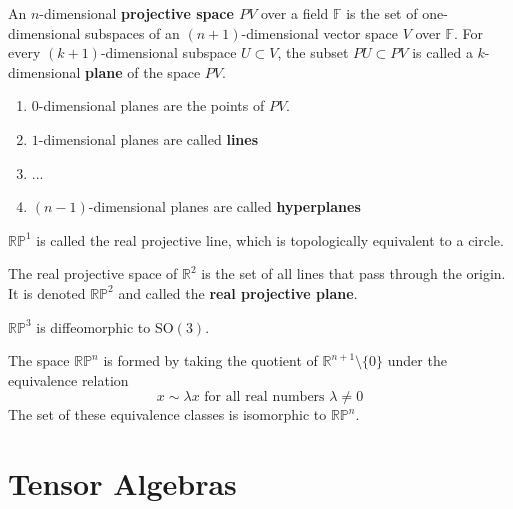 \documentclass{article}
\begin{document}
    \begin{definition}
      An $n$-dimensional \textbf{projective space $PV$} over a field $\mathbb{F}$ is the set of one-dimensional subspaces of an $(n+1)$-dimensional vector space $V$ over $\mathbb{F}$. For every $(k+1)$-dimensional subspace $U \subset V$, the subset $PU \subset PV$ is called a $k$-dimensional \textbf{plane} of the space $PV$. 
      \begin{enumerate}
        \item $0$-dimensional planes are the points of $PV$. 
        \item $1$-dimensional planes are called \textbf{lines}
        \item ...
        \item $(n-1)$-dimensional planes are called \textbf{hyperplanes}
      \end{enumerate}
    \end{definition}

    \begin{definition}
      $\mathbb{RP}^1$ is called the real projective line, which is topologically equivalent to a circle. 
    \end{definition}

    \begin{example}
      The real projective space of $\mathbb{R}^2$ is the set of all lines that pass through the origin. It is denoted $\mathbb{R P}^2$ and called the \textbf{real projective plane}. 
    \end{example}

    \begin{example}
      $\mathbb{RP}^3$ is diffeomorphic to SO$(3)$. 
    \end{example}

    \begin{example}
      The space $\mathbb{RP}^n$ is formed by taking the quotient of $\mathbb{R}^{n+1} \setminus \{0\}$ under the equivalence relation 
      \begin{equation}
        x \sim \lambda x \text{ for all real numbers } \lambda \neq 0
      \end{equation}
      The set of these equivalence classes is isomorphic to $\mathbb{RP}^n$. 
    \end{example}

\section{Tensor Algebras}
\end{document}
